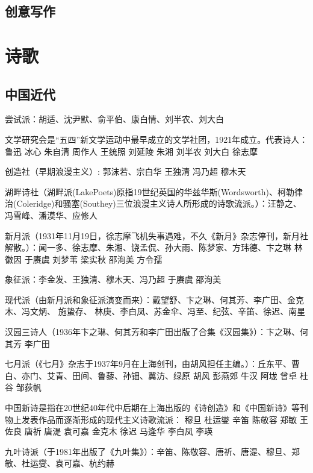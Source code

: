 \documentclass[UTF8]{../../RepresentationUniverse}
\begin{document}
\section{创意写作}



\chapter{诗歌}


\section{中国近代}


尝试派：胡适、沈尹默、俞平伯、康白情、刘半农、刘大白


文学研究会是“五四”新文学运动中最早成立的文学社团，1921年成立。代表诗人： 鲁迅 冰心 朱自清 周作人 王统照 刘延陵 朱湘 刘半农 刘大白 徐志摩


创造社（早期浪漫主义）: 郭沫若、宗白华 王独清 冯乃超 穆木天


湖畔诗社（湖畔派(LakePoets)原指19世纪英国的华兹华斯(Wordsworth)、柯勒律治(Coleridge)和骚塞(Southey)三位浪漫主义诗人所形成的诗歌流派。）：汪静之、冯雪峰、潘漠华、应修人



新月派（1931年11月19日，徐志摩飞机失事遇难，不久《新月》杂志停刊，新月社解散。）：闻一多、徐志摩、朱湘、饶孟侃、孙大雨、陈梦家、方玮德、卞之琳 林徽因 于赓虞 刘梦苇 梁实秋   邵洵美  方令孺 


象征派：李金发、王独清、穆木天、冯乃超 于赓虞 邵洵美



现代派（由新月派和象征派演变而来）：戴望舒、卞之琳、何其芳、李广田、金克木、冯文炳、 施蛰存、 林庚、李白凤、苏金伞、冯至、纪弦、辛笛、徐迟、南星


汉园三诗人（1936年卞之琳、何其芳和李广田出版了合集《汉园集》）：卞之琳、何其芳 李广田



七月派（《七月》杂志于1937年9月在上海创刊，由胡风担任主编。）：丘东平、曹白、亦门、艾青、田间、鲁藜、孙钿、冀汸、绿原 胡风  彭燕郊 牛汉   阿垅 曾卓 杜谷 邹荻帆


中国新诗是指在20世纪40年代中后期在上海出版的《诗创造》和《中国新诗》等刊物上发表作品而逐渐形成的现代主义诗歌流派： 穆旦 杜运燮 辛笛 陈敬容 郑敏 王佐良 唐祈 唐湜 袁可嘉 金克木 徐迟 马逢华 李白凤 李瑛



九叶诗派（于1981年出版了《九叶集》）：辛笛、陈敬容、唐祈、唐湜、穆旦、郑敏、杜运燮、袁可嘉、杭约赫
\end{document}
